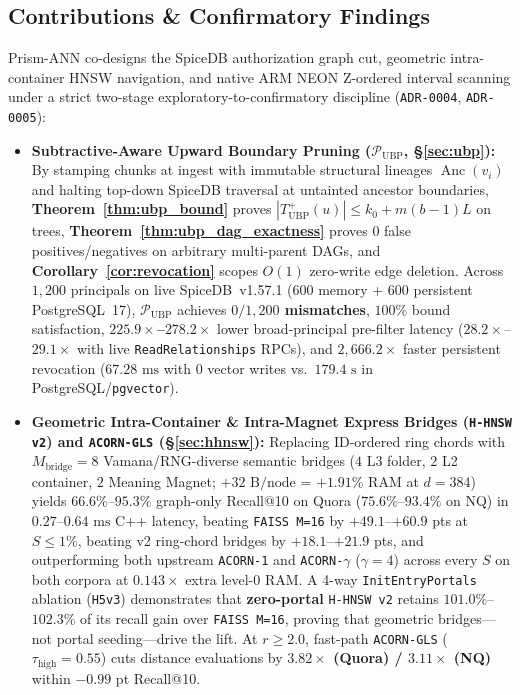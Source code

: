 \documentclass[conference]{IEEEtran}
\begin{document}
\subsection{Contributions \& Confirmatory Findings}
Prism-ANN co-designs the SpiceDB authorization graph cut, geometric intra-container HNSW navigation, and native ARM NEON Z-ordered interval scanning under a strict two-stage exploratory-to-confirmatory discipline (\texttt{ADR-0004}, \texttt{ADR-0005}):
\begin{itemize}
    \item \textbf{Subtractive-Aware Upward Boundary Pruning ($\mathcal{P}_{\text{UBP}}$, \S\ref{sec:ubp}):} By stamping chunks at ingest with immutable structural lineages $\operatorname{Anc}(v_i)$ and halting top-down SpiceDB traversal at untainted ancestor boundaries, \textbf{Theorem~\ref{thm:ubp_bound}} proves $|T_{\text{UBP}}^+(u)| \le k_0 + m(b-1)L$ on trees, \textbf{Theorem~\ref{thm:ubp_dag_exactness}} proves $0$ false positives/negatives on arbitrary multi-parent DAGs, and \textbf{Corollary~\ref{cor:revocation}} scopes $O(1)$ zero-write edge deletion. Across $1{,}200$ principals on live SpiceDB~v1.57.1 ($600$ memory + $600$ persistent PostgreSQL~17), $\mathcal{P}_{\text{UBP}}$ achieves \textbf{$0/1{,}200$ mismatches}, $100\%$ bound satisfaction, \textbf{$225.9\times$--$278.2\times$} lower broad-principal pre-filter latency ($28.2\times$--$29.1\times$ with live \texttt{ReadRelationships} RPCs), and \textbf{$2{,}666.2\times$} faster persistent revocation ($67.28\text{ ms}$ with $0$ vector writes vs.\ $179.4\text{ s}$ in PostgreSQL/\texttt{pgvector}).
    \item \textbf{Geometric Intra-Container \& Intra-Magnet Express Bridges (\texttt{H-HNSW v2}) and \texttt{ACORN-GLS} (\S\ref{sec:hhnsw}):} Replacing ID-ordered ring chords with $M_{\text{bridge}}=8$ Vamana/RNG-diverse semantic bridges ($4$ L3 folder, $2$ L2 container, $2$ Meaning Magnet; $+32\text{ B/node}$ = $+1.91\%$ RAM at $d=384$) yields $66.6\%$--$95.3\%$ graph-only Recall@10 on Quora ($75.6\%$--$93.4\%$ on NQ) in $0.27$--$0.64\text{ ms}$ C++ latency, beating \texttt{FAISS M=16} by $+49.1$--$+60.9$ pts at $S \le 1\%$, beating v2 ring-chord bridges by $+18.1$--$+21.9$ pts, and outperforming both upstream \texttt{ACORN-1} and \texttt{ACORN-$\gamma$} ($\gamma=4$) across every $S$ on both corpora at $0.143\times$ extra level-0 RAM. A 4-way \texttt{InitEntryPortals} ablation (\texttt{H5v3}) demonstrates that \textbf{zero-portal} \texttt{H-HNSW v2} retains $101.0\%$--$102.3\%$ of its recall gain over \texttt{FAISS M=16}, proving that geometric bridges---not portal seeding---drive the lift. At $r \ge 2.0$, fast-path \texttt{ACORN-GLS} ($\tau_{\text{high}}=0.55$) cuts distance evaluations by \textbf{$3.82\times$ (Quora) / $3.11\times$ (NQ)} within $-0.99$ pt Recall@10.

\end{itemize}
\end{document}
